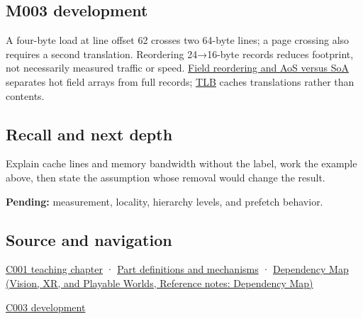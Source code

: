 \subsection{M003 development}\label{appendix-e4ccdbab8320-m003-development}

A four-byte load at line offset 62 crosses two 64-byte lines; a page crossing also requires a second translation. Reordering 24→16-byte records reduces footprint, not necessarily measured traffic or speed. \hyperref[appendix-5522ad176ca0]{Field reordering and AoS versus SoA} separates hot field arrays from full records; \hyperref[appendix-7a2d9c5ce511]{TLB} caches translations rather than contents.

\subsection{Recall and next depth}\label{appendix-e4ccdbab8320-recall-and-next-depth}

Explain cache lines and memory bandwidth without the label, work the example above, then state the assumption whose removal would change the result.

\textbf{Pending:} measurement, locality, hierarchy levels, and prefetch behavior.

\subsection{Source and navigation}\label{appendix-e4ccdbab8320-source-and-navigation}

\hyperref[01-foundations-i-ch001-from-a-signal-to-an-interpretation]{C001 teaching chapter} · \hyperref[appendix-fd090d982a15]{Part definitions and mechanisms} · \href{../07-Vision-XR-and-Playable-Worlds/main.pdf\#nameddest=appendix-4ad47bdd269a}{Dependency Map (Vision, XR, and Playable Worlds, Reference notes: Dependency Map)}

\hyperref[01-foundations-i-ch002-where-the-bytes-live]{C003 development}
